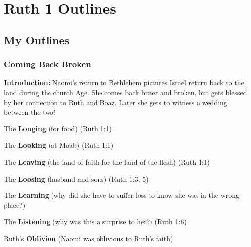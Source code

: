 \section{Ruth 1 Outlines}

\subsection{My Outlines}

\subsubsection{Coming Back Broken}
\textbf{Introduction: }Naomi's return to Bethlehem pictures Israel return back to the land during the church Age. She comes back bitter and broken, but gets blessed by her connection to Ruth and Boaz. Later she gets to witness a wedding between the two!
\begin{compactenum}[I.][7]
    \item The \textbf{Longing} (for food) (Ruth 1:1)
    \item The \textbf{Looking} (at Moab) (Ruth 1:1)
    \item The \textbf{Leaving} (the land of faith for the land of the flesh) (Ruth 1:1)
    \item The \textbf{Loosing} (husband and sons) (Ruth 1:3, 5)
    \item The \textbf{Learning} (why did she have to suffer loss to know she was in the wrong place?) 
    \item The \textbf{Listening} (why was this a surprise to her?)  (Ruth 1:6)
    \item Ruth's \textbf{Oblivion} (Naomi was oblivious to Ruth's faith)  %
\end{compactenum}



